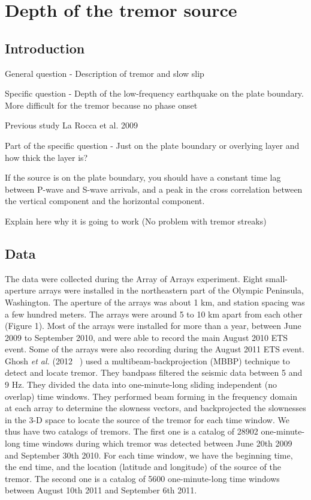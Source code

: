 \documentclass[main.tex]{subfiles}
\begin{document}
\part{Depth of the tremor source}

\chapter{Introduction}

General question - Description of tremor and slow slip

Specific question - Depth of the low-frequency earthquake on the plate boundary. More difficult for the tremor because no phase onset

Previous study La Rocca et al. 2009

Part of the specific question - Just on the plate boundary or overlying layer and how thick the layer is?

If the source is on the plate boundary, you should have a constant time lag between P-wave and S-wave arrivals, and a peak in the cross correlation between the vertical component and the horizontal component.

Explain here why it is going to work (No problem with tremor streaks)

\chapter{Data}

The data were collected during the Array of Arrays experiment. Eight small-aperture arrays were installed in the northeastern part of the Olympic Peninsula, Washington. The aperture of the arrays was about 1 km, and station spacing was a few hundred meters. The arrays were around 5 to 10 km apart from each other (Figure 1). Most of the arrays were installed for more than a year, between June 2009 to September 2010, and were able to record the main August 2010 ETS event. Some of the arrays were also recording during the August 2011 ETS event. Ghosh \textit{et al.} (2012 ~\cite{GHO_2012}) used a multibeam-backprojection (MBBP) technique to detect and locate tremor. They bandpass filtered the seismic data between 5 and 9 Hz. They divided the data into one-minute-long sliding independent (no overlap) time windows. They performed beam forming in the frequency domain at each array to determine the slowness vectors, and backprojected the slownesses in the 3-D space to locate the source of the tremor for each time window. We thus have two catalogs of tremors. The first one is a catalog of 28902 one-minute-long time windows during which tremor was detected between June 20th 2009 and September 30th 2010. For each time window, we have the beginning time, the end time, and the location (latitude and longitude) of the source of the tremor. The second one is a catalog of 5600 one-minute-long time windows between August 10th 2011 and September 6th 2011.
\end{document}
